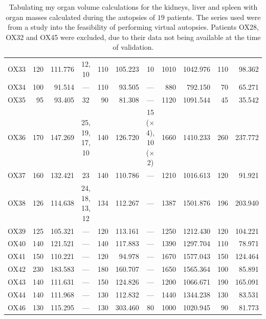 \begin{landscape}
\begin{table}[p]
\begin{center}
\begin{tabular}{c|rrc|rrc|rr|rr}
OX33 & 120 & 111.776 &         12, 10 & 110 & 105.223 &                             10 & 1010 & 1042.976 & 110 &  98.362 \\
OX34 & 100 &  91.514 &            --- & 110 &  93.505 &                            --- &  880 &  792.150 &  70 &  65.271 \\
OX35 &  95 &  93.405 &             32 &  90 &  81.308 &                            --- & 1120 & 1091.544 &  45 &  35.542 \\
OX36 & 170 & 147.269 & 25, 19, 17, 10 & 140 & 126.720 & 15 ($\times$4), 10 ($\times$2) & 1660 & 1410.233 & 260 & 237.772 \\
OX37 & 160 & 132.421 &             23 & 140 & 110.786 &                            --- & 1210 & 1016.613 & 120 &  91.921 \\
OX38 & 126 & 114.638 & 24, 18, 13, 12 & 134 & 112.267 &                            --- & 1387 & 1501.876 & 196 & 203.940 \\
OX39 & 125 & 105.321 &            --- & 120 & 113.161 &                            --- & 1250 & 1212.430 & 120 & 104.221 \\
OX40 & 140 & 121.521 &            --- & 140 & 117.883 &                            --- & 1390 & 1297.704 & 110 &  78.971 \\
OX41 & 150 & 110.221 &            --- & 120 &  94.978 &                            --- & 1670 & 1577.043 & 150 & 124.464 \\
OX42 & 230 & 183.583 &            --- & 180 & 160.707 &                            --- & 1650 & 1565.364 & 100 &  85.891 \\
OX43 & 140 & 111.631 &            --- & 150 & 124.826 &                            --- & 1200 & 1066.671 & 190 & 165.091 \\
OX44 & 140 & 111.968 &            --- & 130 & 112.832 &                            --- & 1440 & 1344.238 & 130 &  83.531 \\
OX46 & 130 & 115.295 &            --- & 130 & 303.460 &                             80 & 1000 & 1020.945 &  90 &  81.773
\end{tabular}
\end{center}
\caption{Tabulating my organ volume calculations for the kidneys, liver and spleen with organ masses calculated during the autopsies of $19$ patients. The series used were from a study into the feasibility of performing virtual autopsies. Patients OX28, OX32 and OX45 were excluded, due to their data not being available at the time of validation.}
\label{tbl:validation-volcalc}
\end{table}
\end{landscape}

